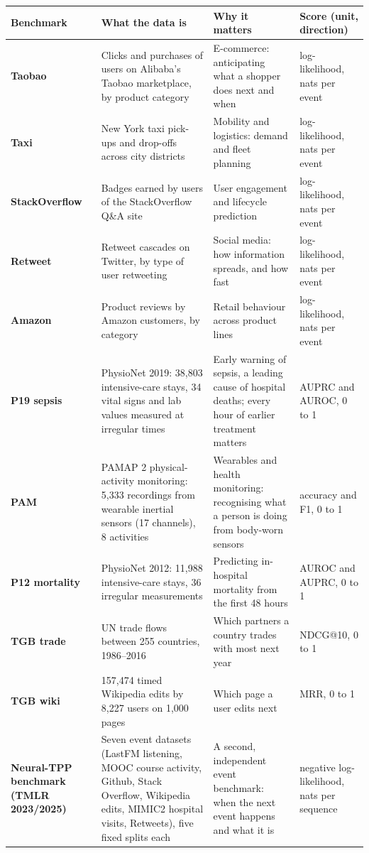 \documentclass[10pt, a4 paper]{article}
\newcommand{\up}{\,{\color{good}\faArrowUp}}
\newcommand{\down}{\,{\color{good}\faArrowDown}}
\begin{document}
{\small
\begin{tabularx}{\linewidth}{>{\bfseries}P{24mm} Y Y P{30mm}}
\toprule
Benchmark & What the data is & Why it matters & Score (unit, direction) \\
\midrule
Taobao & Clicks and purchases of users on Alibaba's Taobao marketplace, by product category & E-commerce: anticipating what a shopper does next and when & log-likelihood, nats per event \up \\
Taxi & New York taxi pick-ups and drop-offs across city districts & Mobility and logistics: demand and fleet planning & log-likelihood, nats per event \up \\
StackOverflow & Badges earned by users of the StackOverflow Q\&A site & User engagement and lifecycle prediction & log-likelihood, nats per event \up \\
Retweet & Retweet cascades on Twitter, by type of user retweeting & Social media: how information spreads, and how fast & log-likelihood, nats per event \up \\
Amazon & Product reviews by Amazon customers, by category & Retail behaviour across product lines & log-likelihood, nats per event \up \\
\midrule
P19 sepsis & PhysioNet 2019: 38,803 intensive-care stays, 34 vital signs and lab values measured at irregular times & Early warning of sepsis, a leading cause of hospital deaths; every hour of earlier treatment matters & AUPRC and AUROC, 0 to 1 \up \\
PAM & PAMAP 2 physical-activity monitoring: 5,333 recordings from wearable inertial sensors (17 channels), 8 activities & Wearables and health monitoring: recognising what a person is doing from body-worn sensors & accuracy and F1, 0 to 1 \up \\
P12 mortality & PhysioNet 2012: 11,988 intensive-care stays, 36 irregular measurements & Predicting in-hospital mortality from the first 48 hours & AUROC and AUPRC, 0 to 1 \up \\
TGB trade & UN trade flows between 255 countries, 1986--2016 & Which partners a country trades with most next year & NDCG@10, 0 to 1 \up \\
TGB wiki & 157,474 timed Wikipedia edits by 8,227 users on 1,000 pages & Which page a user edits next & MRR, 0 to 1 \up \\
\midrule
Neural-TPP benchmark (TMLR 2023/2025) & Seven event datasets (LastFM listening, MOOC course activity, Github, Stack Overflow, Wikipedia edits, MIMIC2 hospital visits, Retweets), five fixed splits each & A second, independent event benchmark: when the next event happens and what it is & negative log-likelihood, nats per sequence \down \\
\bottomrule
\end{tabularx}}
\end{document}
